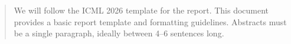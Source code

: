 \documentclass{article}
\theoremstyle{plain}
\theoremstyle{definition}
\theoremstyle{remark}
\begin{document}



\printAffiliationsAndNotice{\icmlEqualContribution}

\begin{abstract}
  We will follow the ICML 2026 template for the report. This document provides a basic report template and formatting guidelines.
  Abstracts must be a single paragraph, ideally between 4--6 sentences long.
\end{abstract}
\end{document}
